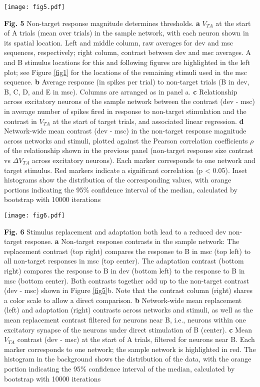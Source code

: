 \documentclass[pdflatex,referee,iicol,sn-basic]{sn-jnl}
\theoremstyle{thmstyleone}%
\theoremstyle{thmstyletwo}%
\theoremstyle{thmstylethree}%
\begin{document}
\begin{figure*}%
    \centering
    \texttt{[image: fig5.pdf]}
    \caption{}
    \label{fig5}
\end{figure*}
\textbf{Fig. 5} Non-target response magnitude determines thresholds.
\textbf{a} $V_{TA}$ at the start of A trials (mean over trials) in the sample network, with each neuron shown in its spatial location. Left and middle column, raw averages for dev and msc sequences, respectively; right column, contrast between dev and msc averages. A and B stimulus locations for this and following figures are highlighted in the left plot; see Figure \ref{fig1} for the locations of the remaining stimuli used in the msc sequence.
\textbf{b} Average response (in spikes per trial) to non-target trials (B in dev, B, C, D, and E in msc). Columns are arranged as in panel a.
\textbf{c} Relationship across excitatory neurons of the sample network between the contrast (dev - msc) in average number of spikes fired in response to non-target stimulation and the contrast in $V_{TA}$ at the start of target trials, and associated linear regression.
\textbf{d} Network-wide mean contrast (dev - msc) in the non-target response magnitude across networks and stimuli, plotted against the Pearson correlation coefficients $\rho$ of the relationship shown in the previous panel (non-target response size contrast vs $\Delta V_{TA}$ across excitatory neurons). Each marker corresponds to one network and target stimulus. Red markers indicate a significant correlation (p < 0.05). Inset histograms show the distribution of the corresponding values, with orange portions indicating the 95\% confidence interval of the median, calculated by bootstrap with 10000 iterations

\begin{figure*}%
    \centering
    \texttt{[image: fig6.pdf]}
    \caption{}
    \label{fig6}
\end{figure*}
\textbf{Fig. 6} Stimulus replacement and adaptation both lead to a reduced dev non-target response.
\textbf{a} Non-target response contrasts in the sample network: The replacement contrast (top right) compares the response to B in msc (top left) to all non-target responses in msc (top center). The adaptation contrast (bottom right) compares the response to B in dev (bottom left) to the response to B in msc (bottom center). Both contrasts together add up to the non-target contrast (dev - msc) shown in Figure \ref{fig5}b. Note that the contrast column (right) shares a color scale to allow a direct comparison.
\textbf{b} Network-wide mean replacement (left) and adaptation (right) contrasts across networks and stimuli, as well as the mean replacement contrast filtered for neurons near B, i.e., neurons within one excitatory synapse of the neurons under direct stimulation of B (center).
\textbf{c} Mean $V_{TA}$ contrast (dev - msc) at the start of A trials, filtered for neurons near B. Each marker corresponds to one network; the sample network is highlighted in red. The histogram in the background shows the distribution of the data, with the orange portion indicating the 95\% confidence interval of the median, calculated by bootstrap with 10000 iterations
\end{document}
